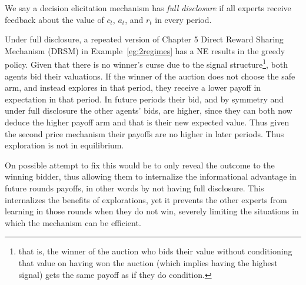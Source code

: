 \begin{defn}
  We say a decision elicitation mechanism has \emph{full disclosure} if all experts receive feedback about the value of $c_t$, $a_t$, and $r_t$ in every period.
 \end{defn}


Under full disclosure, a repeated version of Chapter 5 Direct Reward Sharing  Mechanism (DRSM) in Example~\ref{eg:2regimes} has a NE results in the greedy policy.
Given that there is no winner's curse due to the signal structure\footnote{that is, the winner of the auction who  bids their value without conditioning that value on having won the auction (which implies having the highest signal) gets the same payoff as if they do condition.}, both agents bid their valuations.
If the winner of the auction does not choose the safe arm, and instead explores in that period, they receive a lower payoff in expectation in that period. In future periods their bid, and by symmetry and under full disclosure the other agents' bids, are higher, since they can both now deduce the higher payoff arm and that is their new expected value. Thus given the second price mechanism their payoffs are no higher in later periods. Thus exploration is not in equilibrium. 


On possible attempt to fix this would be to only reveal the outcome to the winning bidder, thus allowing them to internalize the informational advantage in future rounds payoffs, in other words by not having full disclosure.
This internalizes the benefits of explorations, yet it prevents the other experts from learning in those rounds when they do not win, severely limiting the situations in which the mechanism can be efficient.




